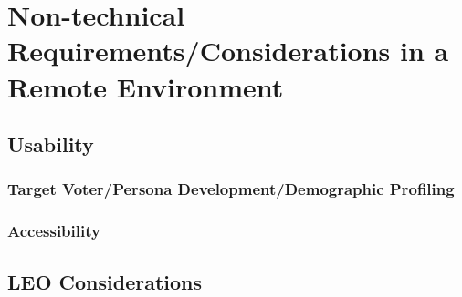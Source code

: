 \chapter{Non-technical Requirements/Considerations in a Remote Environment}

\section{Usability}

\subsection{Target Voter/Persona Development/Demographic Profiling}

\subsection{Accessibility}

\section{LEO Considerations}

